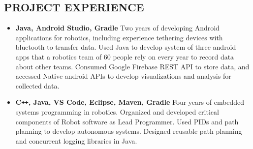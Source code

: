 \documentclass[overlapped]{res}
\begin{document}
\begin{resume}
    \section{PROJECT EXPERIENCE}

    \begin{itemize}[label={}]  \itemsep -2pt %
        \item \textbf{Java, Android Studio, Gradle}
              Two years of developing Android applications for robotics, including experience tethering devices with bluetooth to transfer data.
            Used Java to develop system of three android apps that a robotics team of 60 people rely on every year to record data about other teams.
             Consumed Google Firebase REST API to store data, and accessed Native android APIs to develop visualizations and analysis for collected data.
        \item \textbf{C\texttt{++}, Java, VS Code, Eclipse, Maven, Gradle}
              Four years of embedded systems programming in robotics. Organized and developed critical components of Robot software as Lead Programmer.
              Used PIDs and path planning to develop autonomous systems. Designed reusable path planning and concurrent logging libraries in Java.
    \end{itemize}


\end{resume}
\end{document}

